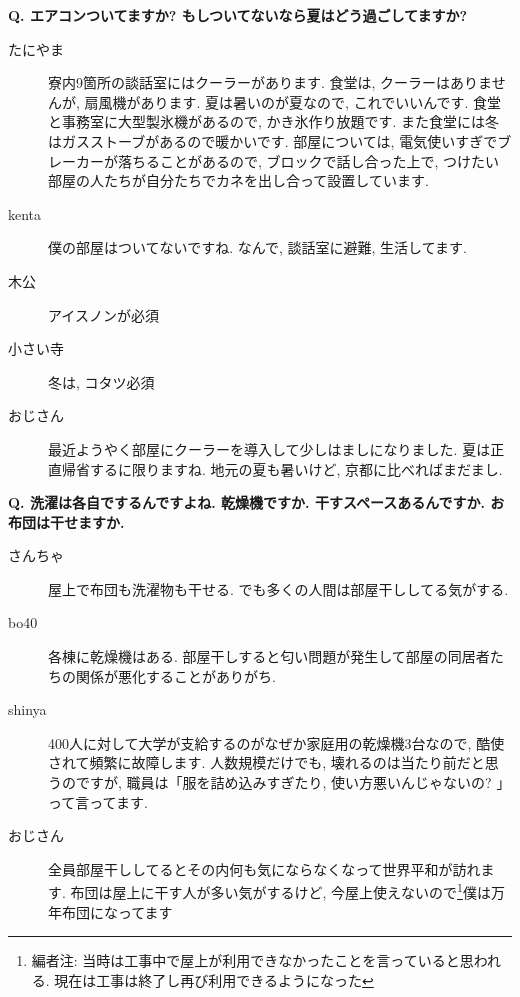 \documentclass[10pt,b5jsbook,dvips,dvipdfmx,openany]{jsbook}
\theoremstyle{definition}
\begin{document}
		\begin{multicols}{2}
		\begin{tcolorbox}
		\textbf{Q. エアコンついてますか? もしついてないなら夏はどう過ごしてますか?}
		\end{tcolorbox}
		\begin{description}
		\item[たにやま]
		寮内9箇所の談話室にはクーラーがあります. 食堂は, クーラーはありませんが, 扇風機があります. 夏は暑いのが夏なので, これでいいんです. 食堂と事務室に大型製氷機があるので, かき氷作り放題です. また食堂には冬はガスストーブがあるので暖かいです. 部屋については, 電気使いすぎでブレーカーが落ちることがあるので, ブロックで話し合った上で, つけたい部屋の人たちが自分たちでカネを出し合って設置しています.
		\item[kenta]
		僕の部屋はついてないですね. なんで, 談話室に避難, 生活してます.
		\item[木公]
		アイスノンが必須
		\item[小さい寺]
		冬は, コタツ必須
		\item[おじさん]
		最近ようやく部屋にクーラーを導入して少しはましになりました. 夏は正直帰省するに限りますね. 地元の夏も暑いけど, 京都に比べればまだまし.
		\end{description}

		\begin{tcolorbox}
		\textbf{Q. 洗濯は各自でするんですよね. 乾燥機ですか. 干すスペースあるんですか. お布団は干せますか. }
		\end{tcolorbox}
		\begin{description}
		\item[さんちゃ]屋上で布団も洗濯物も干せる. でも多くの人間は部屋干ししてる気がする.
		\item[bo40]各棟に乾燥機はある. 部屋干しすると匂い問題が発生して部屋の同居者たちの関係が悪化することがありがち.
		\item[shinya]
		400人に対して大学が支給するのがなぜか家庭用の乾燥機3台なので, 酷使されて頻繁に故障します. 人数規模だけでも, 壊れるのは当たり前だと思うのですが, 職員は「服を詰め込みすぎたり, 使い方悪いんじゃないの? 」って言ってます.
		\item[おじさん]
		全員部屋干ししてるとその内何も気にならなくなって世界平和が訪れます. 布団は屋上に干す人が多い気がするけど, 今屋上使えないので\footnote{編者注: 当時は工事中で屋上が利用できなかったことを言っていると思われる. 現在は工事は終了し再び利用できるようになった}僕は万年布団になってます
		\end{description}



\end{multicols}
\end{document}
